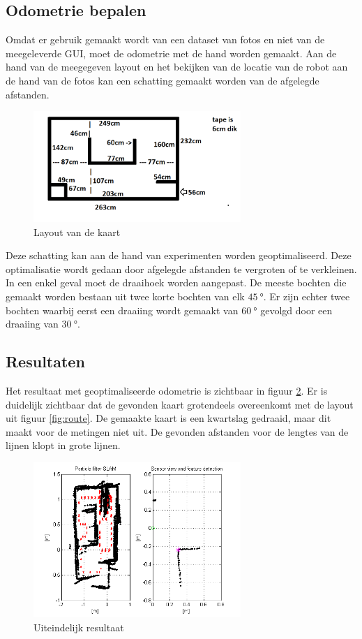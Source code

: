 \documentclass[a4paper]{article}
\begin{document}
\subsection{Odometrie bepalen}
Omdat er gebruik gemaakt wordt van een dataset van fotos en niet van de meegeleverde GUI, moet de odometrie met de hand worden gemaakt. Aan de hand van de meegegeven layout en het bekijken van de locatie van de robot aan de hand van de fotos kan een schatting gemaakt worden van de afgelegde afstanden.
\begin{figure}[h]
	\centering
	\includegraphics[width=0.7\textwidth]{matlab/imgs/layout.png}
	\caption{Layout van de kaart}
	\label{fig:layout}
\end{figure}
Deze schatting kan aan de hand van experimenten worden geoptimaliseerd. Deze optimalisatie wordt gedaan door afgelegde afstanden te vergroten of te verkleinen. In een enkel geval moet de draaihoek worden aangepast. De meeste bochten die gemaakt worden bestaan uit twee korte bochten van elk $\SI{45}{\degree}$. Er zijn echter twee bochten waarbij eerst een draaiing wordt gemaakt van $\SI{60}{\degree}$ gevolgd door een draaiing van $\SI{30}{\degree}$.
\subsection{Resultaten}
Het resultaat met geoptimaliseerde odometrie is zichtbaar in figuur \ref{fig:final}. Er is duidelijk zichtbaar dat de gevonden kaart grotendeels overeenkomt met de layout uit figuur \ref{fig:route}. De gemaakte kaart is een kwartslag gedraaid, maar dit maakt voor de metingen niet uit. De gevonden afstanden voor de lengtes van de lijnen klopt in grote lijnen. 
\begin{figure}[h]
	\centering
	\includegraphics[width=0.7\textwidth]{img/statusnow.png}
	\caption{Uiteindelijk resultaat}
	\label{fig:final}
\end{figure}
\end{document}
